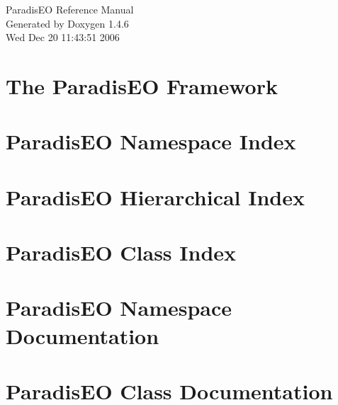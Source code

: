 \documentclass[a4paper]{book}
\begin{document}
\begin{titlepage}
\vspace*{7cm}
\begin{center}
{\Large Paradis\-EO Reference Manual}\\
\vspace*{1cm}
{\large Generated by Doxygen 1.4.6}\\
\vspace*{0.5cm}
{\small Wed Dec 20 11:43:51 2006}\\
\end{center}
\end{titlepage}
\clearemptydoublepage
{}
\tableofcontents
\clearemptydoublepage
{}
\chapter{The Paradis\-EO Framework }
\label{index}
\chapter{Paradis\-EO Namespace Index}

\chapter{Paradis\-EO Hierarchical Index}

\chapter{Paradis\-EO Class Index}

\chapter{Paradis\-EO Namespace Documentation}

\chapter{Paradis\-EO Class Documentation}
























\printindex
\end{document}
